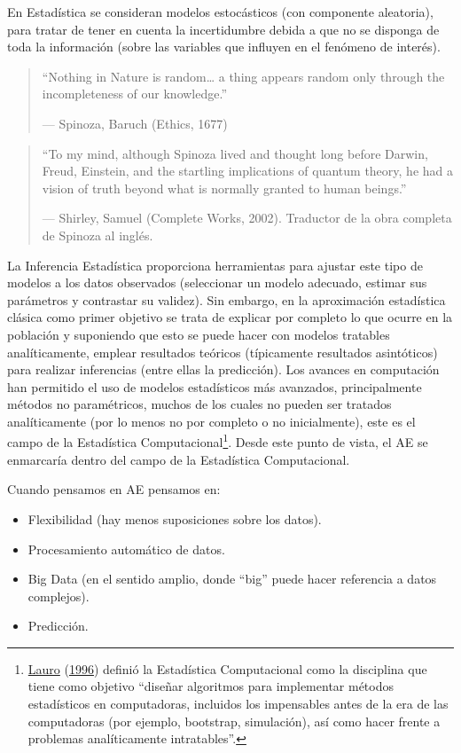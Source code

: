 \documentclass[
  spanish,
]{book}
\theoremstyle{break}
\theoremstyle{definition}
\theoremstyle{definition}
\theoremstyle{definition}
\theoremstyle{definition}
\theoremstyle{remark}
\begin{document}
En Estadística se consideran modelos estocásticos (con componente aleatoria), para tratar de tener en cuenta la incertidumbre debida a que no se disponga de toda la información (sobre las variables que influyen en el fenómeno de interés).

\begin{quote}
``Nothing in Nature is random\ldots{} a thing appears random only through the incompleteness of our knowledge.''

--- Spinoza, Baruch (Ethics, 1677)
\end{quote}

\begin{quote}
``To my mind, although Spinoza lived and thought long before Darwin, Freud, Einstein, and the startling implications of quantum theory, he had a vision of truth beyond what is normally granted to human beings.''

--- Shirley, Samuel (Complete Works, 2002). Traductor de la obra completa de Spinoza al inglés.
\end{quote}

La Inferencia Estadística proporciona herramientas para ajustar este tipo de modelos a los datos observados (seleccionar un modelo adecuado, estimar sus parámetros y contrastar su validez).
Sin embargo, en la aproximación estadística clásica como primer objetivo se trata de explicar por completo lo que ocurre en la población y suponiendo que esto se puede hacer con modelos tratables analíticamente, emplear resultados teóricos (típicamente resultados asintóticos) para realizar inferencias (entre ellas la predicción).
Los avances en computación han permitido el uso de modelos estadísticos más avanzados, principalmente métodos no paramétricos, muchos de los cuales no pueden ser tratados analíticamente (por lo menos no por completo o no inicialmente), este es el campo de la Estadística Computacional\footnote{\protect\hyperlink{ref-lauro1996computational}{Lauro} (\protect\hyperlink{ref-lauro1996computational}{1996}) definió la Estadística Computacional como la disciplina que tiene como objetivo ``diseñar algoritmos para implementar métodos estadísticos en computadoras, incluidos los impensables antes de la era de las computadoras (por ejemplo, bootstrap, simulación), así como hacer frente a problemas analíticamente intratables''.}. Desde este punto de vista, el AE se enmarcaría dentro del campo de la Estadística Computacional.

Cuando pensamos en AE pensamos en:

\begin{itemize}
\item
  Flexibilidad (hay menos suposiciones sobre los datos).
\item
  Procesamiento automático de datos.
\item
  Big Data (en el sentido amplio, donde ``big'' puede hacer referencia a datos complejos).
\item
  Predicción.
\end{itemize}
\end{document}
